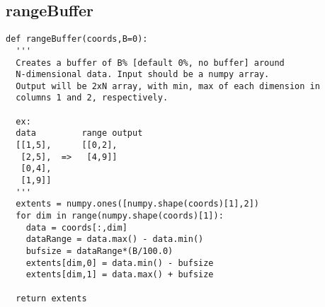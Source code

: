 \subsection{rangeBuffer}
\begin{verbatim}
def rangeBuffer(coords,B=0):
  '''
  Creates a buffer of B% [default 0%, no buffer] around 
  N-dimensional data. Input should be a numpy array.
  Output will be 2xN array, with min, max of each dimension in
  columns 1 and 2, respectively.
  
  ex: 
  data         range output
  [[1,5],      [[0,2],
   [2,5],  =>   [4,9]]
   [0,4],
   [1,9]]
  '''
  extents = numpy.ones([numpy.shape(coords)[1],2])
  for dim in range(numpy.shape(coords)[1]):
    data = coords[:,dim]
    dataRange = data.max() - data.min()
    bufsize = dataRange*(B/100.0)
    extents[dim,0] = data.min() - bufsize
    extents[dim,1] = data.max() + bufsize
    
  return extents
\end{verbatim}

